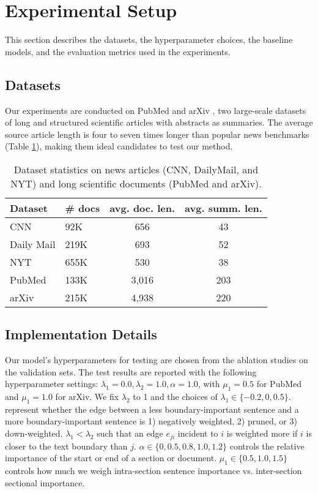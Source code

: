 \documentclass[11pt,a4paper]{article}
\begin{document}
\section{Experimental Setup}
This section describes the datasets, the hyperparameter choices, the baseline models, and the evaluation metrics used in the experiments. 

\subsection{Datasets}
Our experiments are conducted on PubMed and arXiv \cite{cohan2018discourse}, two large-scale datasets of long and structured scientific articles with abstracts as summaries. The average source article length is four to seven times longer than popular news benchmarks (Table \ref{tab:datasets}), making them ideal candidates to test our method. 
\begin{table}[t!]
\small
\centering
\begin{tabular}{|l|l|c|c|}
\toprule
Dataset & \# docs & avg. doc. len. & avg. summ. len. \\ \midrule
CNN & 92K & 656 & 43 \\ 
Daily Mail & 219K & 693 & 52 \\ 
NYT & 655K & 530 & 38 \\ 
PubMed & 133K & 3,016 & 203 \\ 
arXiv & 215K & 4,938 & 220 \\ 
\bottomrule
\end{tabular}
\caption{\small Dataset statistics on news articles (CNN, DailyMail, and NYT) and long scientific documents (PubMed and arXiv).} \label{tab:datasets}
\end{table}

\subsection{Implementation Details}\label{sub-sec:hyperparams}
Our model's hyperparameters for testing are chosen from the ablation studies on the validation sets. The test results are reported with the following hyperparameter settings: $\lambda_1=0.0, \lambda_2=1.0, \alpha=1.0$, with $\mu_1 = 0.5$ for PubMed and $\mu_1 = 1.0$ for arXiv.
We fix $\lambda_2$ to 1 and the choices of $\lambda_1 \in \{-0.2, 0, 0.5\}$. represent whether the edge between a less boundary-important sentence and a more boundary-important sentence is 1) negatively weighted, 2) pruned, or 3) down-weighted. $\lambda_1 < \lambda_2$ such that an edge $e_{ji}$ incident to $i$ is weighted more if $i$ is closer to the text boundary than $j$. $\alpha \in \{0, 0.5, 0.8, 1.0, 1.2\}$ controls the relative importance of the start or end of a section or document. $\mu_1 \in \{0.5, 1.0, 1.5\}$ controls how much we weigh intra-section sentence importance vs. inter-section sectional importance.
\end{document}
